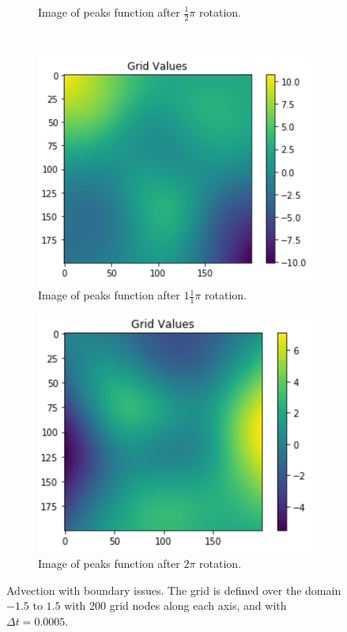 \begin{figure}
\begin{subfigure}[b]{0.40\linewidth}
		\caption{Image of peaks function after $\frac{1}{2}\pi$ rotation.}
		\label{et1}
	\end{subfigure}
	\\
	\begin{subfigure}[b]{0.40\linewidth}
		\centering
		\includegraphics[width=\linewidth]{Materials/Lagrangian/et2}
		\caption{Image of peaks function after $1\frac{1}{1}\pi$ rotation.}
		\label{et2}
	\end{subfigure}
	\hfill
	\begin{subfigure}[b]{0.40\linewidth}
		\centering
		\includegraphics[width=\linewidth]{Materials/Lagrangian/et3}
		\caption{Image of peaks function after $2\pi$ rotation.}
		\label{et3}
	\end{subfigure}
	\caption{Advection with boundary issues. The grid is defined over the domain $-1.5$ to $1.5$ with 200 grid nodes along each axis, and with $\Delta t = 0.0005$.}
	\label{experiment1}
\end{figure}
